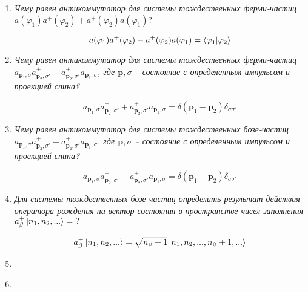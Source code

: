 \documentclass{article}
\begin{document}
\begin{enumerate}
	\item \textit{Чему равен антикоммутатор для системы тождественных ферми-частиц \\$a(\varphi_1)a^+(\varphi_2) + a^+(\varphi_2)a(\varphi_1)?$}
	
	\begin{equation}
		a(\varphi_1)a^+(\varphi_2) - a^+(\varphi_2)a(\varphi_1) = \braket{\varphi_1|\varphi_2}
	\end{equation}
	
	\item \textit{Чему равен антикоммутатор для системы тождественных ферми-частиц \\ $a_{\textbf{p}_1,\sigma} a^+_{\textbf{p}_2,\sigma'} + a^+_{\textbf{p}_2,\sigma'}a_{\textbf{p}_1,\sigma}$, где ${\textbf{p},\sigma}$ – состояние с определенным импульсом и проекцией спина?}
	
	\begin{equation}
		a_{\textbf{p}_1,\sigma} a^+_{\textbf{p}_2,\sigma'} + a^+_{\textbf{p}_2,\sigma'}a_{\textbf{p}_1,\sigma} = \delta(\textbf{p}_1 - \textbf{p}_2)\delta_{\sigma\sigma'}
	\end{equation}
	
	\item \textit{Чему равен антикоммутатор для системы тождественных бозе-частиц \\ $a_{\textbf{p}_1,\sigma} a^+_{\textbf{p}_2,\sigma'} - a^+_{\textbf{p}_2,\sigma'}a_{\textbf{p}_1,\sigma}$, где ${\textbf{p},\sigma}$ – состояние с определенным импульсом и проекцией спина?}
	
	\begin{equation}
		a_{\textbf{p}_1,\sigma} a^+_{\textbf{p}_2,\sigma'} - a^+_{\textbf{p}_2,\sigma'}a_{\textbf{p}_1,\sigma} = \delta(\textbf{p}_1 - \textbf{p}_2)\delta_{\sigma\sigma'}
	\end{equation}
	
	\item \textit{Для системы тождественных бозе-частиц определить результат действия оператора рождения на вектор состояния в пространстве чисел заполнения $a^+_\beta \ket{n_1, n_2, ...} = \ ?$}
	
	\begin{equation}
		a^+_\beta \ket{n_1, n_2, ...} = \sqrt{n_\beta + 1} \ket{n_1, n_2, ..., n_\beta +1,...}
	\end{equation}
	
	\item \textit{}
	
	\item \textit{}
	

\end{enumerate}
\end{document}
